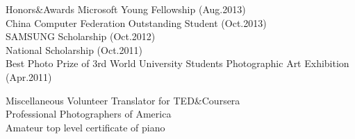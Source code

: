 \documentclass{resume} %
\begin{document}
\begin{rSection}{Honors\&Awards}
Microsoft Young Fellowship (Aug.2013) \\
China Computer Federation Outstanding Student (Oct.2013) \\
SAMSUNG Scholarship (Oct.2012) \\
National Scholarship (Oct.2011) \\
Best Photo Prize of 3rd World University Students Photographic Art Exhibition (Apr.2011) \\
\end{rSection}


\begin{rSection}{Miscellaneous}
Volunteer Translator for TED\&Coursera \\
Professional Photographers of America \\
Amateur top level certificate of piano
\end{rSection}

\end{document}
